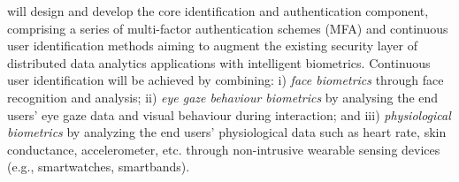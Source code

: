 \begin{Workpackage}{\thewpno}
\begin{Task}
\end{Task}

\begin{Task}
\TaskResults{%
\ref{del:auth1},
\ref{del:auth2},
\ref{del:auth3}
}
\TaskHeader{}

\theTask{} will design and develop the core identification and authentication component, comprising a series of multi-factor authentication schemes (MFA) and continuous user identification methods aiming to augment the existing security layer of distributed data analytics applications with intelligent biometrics. Continuous user identification will be achieved by combining: i) \textit{face biometrics} through face recognition and analysis; ii) \textit{eye gaze behaviour biometrics} by analysing the end users' eye gaze data and visual behaviour during interaction; and iii) \textit{physiological biometrics} by analyzing the end users' physiological data such as heart rate, skin conductance, accelerometer, etc. through non-intrusive wearable sensing devices (e.g., smartwatches, smartbands). 
\taskbreak

\end{Task}
\end{Workpackage}
